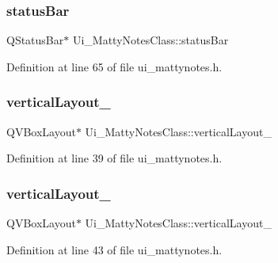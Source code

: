 \hypertarget{classUi__MattyNotesClass_a00010e0401915a0f78491262b87b807d}{}\label{classUi__MattyNotesClass_a00010e0401915a0f78491262b87b807d} 
\subsubsection{\texorpdfstring{status\+Bar}{statusBar}}
{\footnotesize\ttfamily Q\+Status\+Bar$\ast$ Ui\+\_\+\+Matty\+Notes\+Class\+::status\+Bar}



Definition at line 65 of file ui\+\_\+mattynotes.\+h.

\hypertarget{classUi__MattyNotesClass_a387c14ba400cb9ab0b33b5000276d66b}{}\label{classUi__MattyNotesClass_a387c14ba400cb9ab0b33b5000276d66b} 
\subsubsection{\texorpdfstring{vertical\+Layout\+\_}{verticalLayout\_3}}
{\footnotesize\ttfamily Q\+V\+Box\+Layout$\ast$ Ui\+\_\+\+Matty\+Notes\+Class\+::vertical\+Layout\+\_}



Definition at line 39 of file ui\+\_\+mattynotes.\+h.

\hypertarget{classUi__MattyNotesClass_a93592607728a9455d5914a0a6a3c8307}{}\label{classUi__MattyNotesClass_a93592607728a9455d5914a0a6a3c8307} 
\subsubsection{\texorpdfstring{vertical\+Layout\+\_}{verticalLayout\_4}}
{\footnotesize\ttfamily Q\+V\+Box\+Layout$\ast$ Ui\+\_\+\+Matty\+Notes\+Class\+::vertical\+Layout\+\_}



Definition at line 43 of file ui\+\_\+mattynotes.\+h.

